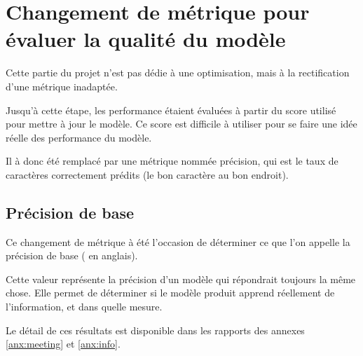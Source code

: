 \section{Changement de métrique pour évaluer la qualité du modèle}
Cette partie du projet n'est pas dédie à une optimisation, mais à la rectification d'une métrique inadaptée.

Jusqu'à cette étape, les performance étaient évaluées à partir du score utilisé pour mettre à jour le modèle. Ce score est difficile à utiliser pour se faire une idée réelle des performance du modèle. %

Il à donc été remplacé par une métrique nommée \og précision\fg{}, qui est le taux de caractères correctement prédits (le bon caractère au bon endroit).

\subsection{Précision de base}
Ce changement de métrique à été l'occasion de déterminer ce que l'on appelle la précision de base ( en anglais).

Cette valeur représente la précision d'un modèle qui répondrait toujours la même chose.
Elle permet de déterminer si le modèle produit apprend réellement de l'information, et dans quelle mesure.

Le détail de ces résultats est disponible dans les rapports des annexes \ref{anx:meeting} et \ref{anx:info}.

